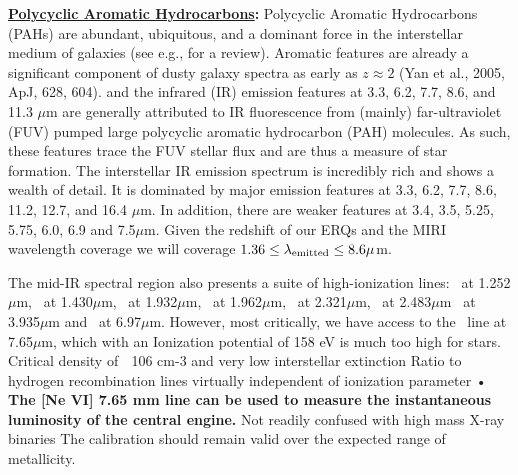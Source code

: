 \smallskip
\smallskip
\noindent
{\bf \underline{Polycyclic Aromatic Hydrocarbons}:}
Polycyclic Aromatic Hydrocarbons (PAHs) are abundant, ubiquitous, and
a dominant force in the interstellar medium of galaxies (see e.g., for
a review).  Aromatic features are already a significant component of
dusty galaxy spectra as early as $z\approx2$ (Yan et al., 2005, ApJ,
628, 604).  and the infrared (IR) emission features at 3.3, 6.2, 7.7,
8.6, and 11.3 $\mu$m are generally attributed to IR fluorescence from
(mainly) far-ultraviolet (FUV) pumped large polycyclic aromatic
hydrocarbon (PAH) molecules. As such, these features trace the FUV
stellar flux and are thus a measure of star formation.  The
interstellar IR emission spectrum is incredibly rich and shows a
wealth of detail.  It is dominated by major emission features at 3.3,
6.2, 7.7, 8.6, 11.2, 12.7, and 16.4 $\mu$m.  In addition, there are
weaker features at 3.4, 3.5, 5.25, 5.75, 6.0, 6.9 and 7.5$\mu$m.  
Given the redshift of our ERQs and
the MIRI wavelength coverage we will coverage $1.36 \leq \lambda_{\rm
emitted} \leq 8.6 \mu$m.

\smallskip
\smallskip
\noindent
The mid-IR spectral region
also presents a suite of high-ionization lines: \snine\ at
1.252$\mu$m, \six\ at 1.430$\mu$m, \sixi\ at 1.932$\mu$m, \sivi\ at
1.962$\mu$m, \caviii\ at 2.321$\mu$m, \sivi\ at 2.483$\mu$m \siix\ at
3.935$\mu$m and \arii\ at 6.97$\mu$m.
However, most critically, we have access to the 
\nevi\ line at 7.65$\mu$m, which with an Ionization potential of 158 eV is much too high for stars.
 Critical density of  106 cm-3 and very low interstellar extinction
 Ratio to hydrogen recombination lines virtually independent of ionization parameter • 
{\bf The [Ne VI] 7.65 mm line can be used to measure the instantaneous luminosity of the central engine.}
Not readily confused with high mass X-ray binaries
%
The calibration should remain valid over the expected range of metallicity.



